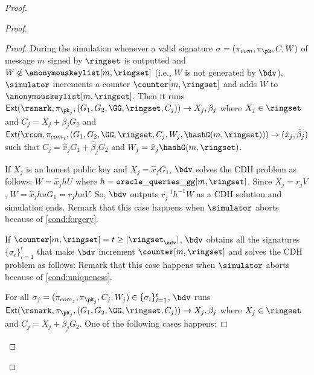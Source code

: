 \begin{proof}
\begin{proof}
\begin{proof}
			During the simulation whenever a valid signature $ \sigma = (\pi_{com},\pi_{\pk},C,W) $ of message $ m $ signed by $ \ringset $ is outputted and $ W \notin \anonymouskeylist[m,\ringset] $ (i.e., $ W $ is not generated by $ \bdv $), $ \simulator $ increments a counter $ \counter[m,\ringset] $ and adds $ W $ to $ \anonymouskeylist[m,\ringset] $.
			Then it runs $ \mathsf{Ext}(\rsnark,\pi_{\pk_j},(G_1,G_2, \GG,\ringset, C_j) ) \rightarrow X_j, \beta_j$ where $ X_j\in \ringset $ and $ C_j = X_j + \beta_j G_2 $ and $ \mathsf{Ext}(\rcom,\pi_{com_j},(G_1,G_2, \GG,\ringset, C_j,W_j,\hashG(m,\ringset))) \rightarrow (\hat{x}_j,\hat{\beta}_j )$ such that $ C_j = \hat{x}_jG_1 + \hat{\beta}_j G_2 $ and $ W_j = \hat{x}_j \hashG(m,\ringset) $. 
			
			If $ X_j  $ is an honest public key and $ X_j = \hat{x}_jG_1 $, $ \bdv $ solves the CDH problem as follows: $ W = \hat{x}_j h U $ where $ h = \mathtt{oracle\_queries\_gg}[m, \ringset] $. Since $ X_j = r_j V $, $ W = \hat{x}_jhuG_1 =r_jhuV $. So, $ \bdv $ outputs $ r_j^{-1}h^{-1}W $ as a CDH solution and simulation ends. Remark that this case happens when $ \simulator $ aborts because of \ref{cond:forgery}.
			
			If $  \counter[m,\ringset] = t \geq |\ringset_\adv| $, $ \bdv $ obtains all the signatures $ \{\sigma_i\}_{i =1}^t $ that make $ \bdv $ increment $ \counter[m,\ringset] $ and solves the CDH problem as follows: Remark that this case happens when $ \simulator $ aborts because of \ref{cond:uniqueness}.
			
			For all $ \sigma_j = (\pi_{com_j},\pi_{\pk_j},C_j,W_j) \in \{\sigma_i\}_{i =1}^t $, $ \bdv $ runs $ \mathsf{Ext}(\rsnark,\pi_{\pk_j},(G_1,G_2, \GG,\ringset, C_j) ) \rightarrow X_j, \beta_j$ where $ X_j\in \ringset $ and $ C_j = X_j + \beta_j G_2 $. One of the following cases happens:
			

\end{proof}
\end{proof}
\end{proof}
